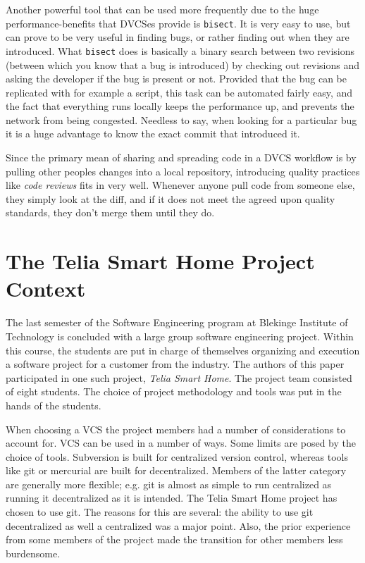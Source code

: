 \documentclass{llncs}
\begin{document}
Another powerful tool that can be used more frequently due to the huge
performance-benefits that DVCSes provide is \verb!bisect!. It is very
easy to use, but can prove to be very useful in finding bugs, or
rather finding out when they are introduced. What \verb!bisect! does
is basically a binary search between two revisions (between which you
know that a bug is introduced) by checking out revisions and asking
the developer if the bug is present or not. Provided that the bug can
be replicated with for example a script, this task can be automated
fairly easy, and the fact that everything runs locally keeps the
performance up, and prevents the network from being congested.
Needless to say, when looking for a particular bug it is a huge
advantage to know the exact commit that introduced it.

Since the primary mean of sharing and spreading code in a DVCS
workflow is by pulling other peoples changes into a local repository,
introducing quality practices like \emph{code reviews} fits in very
well. Whenever anyone pull code from someone else, they simply look at
the diff, and if it does not meet the agreed upon quality standards,
they don't merge them until they do\cite{osullivan09}.

\section{The Telia Smart Home Project Context}
\label{sec:telia}

The last semester of the Software Engineering program at Blekinge
Institute of Technology is concluded with a large group software
engineering project. Within this course, the students are put in
charge of themselves organizing and execution a software project for a
customer from the industry. The authors of this paper participated in
one such project, \emph{Telia Smart Home}. The project team consisted
of eight students. The choice of project methodology and tools was put
in the hands of the students.

When choosing a VCS the project members had a number of considerations
to account for. VCS can be used in a number of ways. Some limits are
posed by the choice of tools. Subversion is built for centralized
version control, whereas tools like git or mercurial are built for
decentralized. Members of the latter category are generally more
flexible; e.g. git is almost as simple to run centralized as running
it decentralized as it is intended. The Telia Smart Home project has
chosen to use git. The reasons for this are several: the ability to
use git decentralized as well a centralized was a major point. Also,
the prior experience from some members of the project made the
transition for other members less burdensome.
\end{document}
